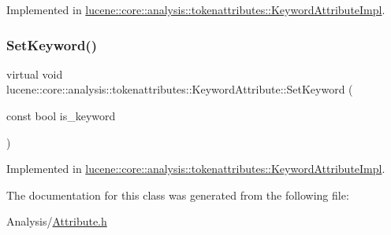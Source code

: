 Implemented in \mbox{\hyperlink{classlucene_1_1core_1_1analysis_1_1tokenattributes_1_1KeywordAttributeImpl_aa98aa28fbea635057a71d0129cb92a2e}{lucene\+::core\+::analysis\+::tokenattributes\+::\+Keyword\+Attribute\+Impl}}.

\mbox{\label{classlucene_1_1core_1_1analysis_1_1tokenattributes_1_1KeywordAttribute_aee23c674ba6af03521985734f739c9d5}} 
\subsubsection{\texorpdfstring{Set\+Keyword()}{SetKeyword()}}
{\footnotesize\ttfamily virtual void lucene\+::core\+::analysis\+::tokenattributes\+::\+Keyword\+Attribute\+::\+Set\+Keyword (\begin{DoxyParamCaption}\item[{const bool}]{is\+\_\+keyword }\end{DoxyParamCaption})\hspace{0.3cm}{\ttfamily [pure virtual]}}



Implemented in \mbox{\hyperlink{classlucene_1_1core_1_1analysis_1_1tokenattributes_1_1KeywordAttributeImpl_a1cae85f0e103d3dfa054c1a42e119de2}{lucene\+::core\+::analysis\+::tokenattributes\+::\+Keyword\+Attribute\+Impl}}.



The documentation for this class was generated from the following file\+:\begin{DoxyCompactItemize}
\item 
Analysis/\mbox{\hyperlink{Analysis_2Attribute_8h}{Attribute.\+h}}\end{DoxyCompactItemize}
